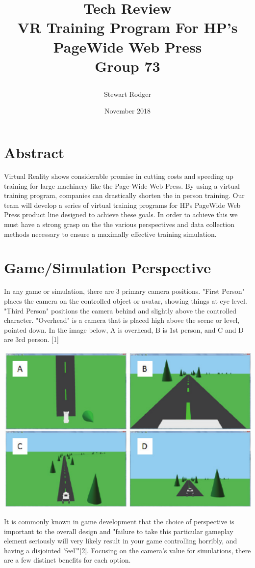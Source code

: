 \documentclass{article}
\title{
{Tech Review } \\
{\large VR Training Program For HP's PageWide Web Press} \\
{\small Group 73}
\author{Stewart Rodger }
}
\date{November 2018}
\begin{document}
\maketitle

\section*{Abstract}
Virtual Reality shows considerable promise in cutting costs and speeding up training for large machinery like the Page-Wide Web Press. By using a virtual training program, companies can drastically shorten the in person training. Our team will develop a series of virtual training programs for HPs PageWide Web Press product line designed to achieve these goals. In order to achieve this we must have a strong grasp on the the various perspectives and data collection methods necessary to ensure a maximally effective training simulation.      

\section{Game/Simulation Perspective}
In any game or simulation, there are 3 primary camera positions. "First Person" places the camera on the controlled object or avatar, showing things at eye level. "Third Person" positions the camera behind and slightly above the controlled character. "Overhead" is a camera that is placed high above the scene or level, pointed down. In the image below, A is overhead, B is 1st person, and C and D are 3rd person. [1] 

\includegraphics[width=\textwidth]{13o.png}

It is commonly known in game development that the choice of perspective is important to the overall design and "failure to take this particular gameplay element seriously will very likely result in your game controlling horribly, and having a disjointed 'feel'"[2]. Focusing on the camera's value for simulations, there are a few distinct benefits for each option. 
\end{document}
